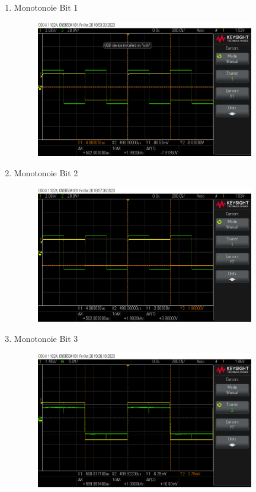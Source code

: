 
\addchap{\langanhang}

 

{\Large
\begin{enumerate}[label=\Alph*.]
	\item Monotonoie Bit 1
	\begin{figure}[H]
		\centering
		\includegraphics[height=6cm]{images/monotonie 1bit.png}
	\end{figure}
	\item Monotonoie Bit 2
	\begin{figure}[H]
		\centering
		\includegraphics[height=6cm]{images/monotonie 2bit.png}
	\end{figure}
	\pagebreak
	\item Monotonoie Bit 3
	\begin{figure}[H]
		\centering
		\includegraphics[height=6cm]{images/monotonie 3bit.png} 

\end{figure}
\end{enumerate}}
